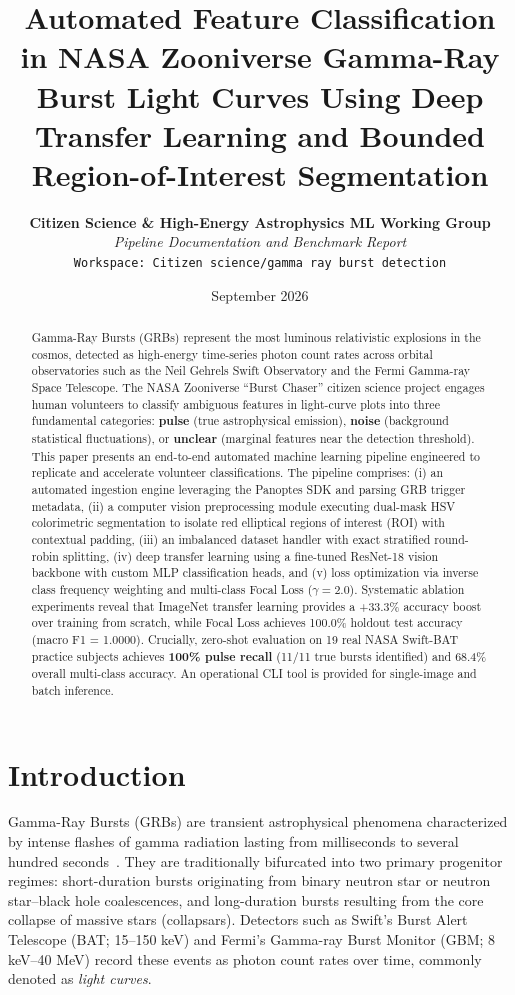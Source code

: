 \documentclass[10pt,twocolumn]{article}
\title{\textbf{\Large Automated Feature Classification in NASA Zooniverse Gamma-Ray Burst Light Curves Using Deep Transfer Learning and Bounded Region-of-Interest Segmentation}}
\author{
    \textbf{Citizen Science \& High-Energy Astrophysics ML Working Group} \\
    \textit{Pipeline Documentation and Benchmark Report} \\
    \texttt{Workspace: Citizen science/gamma ray burst detection}
}
\date{September 2026}
\begin{document}
\maketitle

\begin{abstract}
Gamma-Ray Bursts (GRBs) represent the most luminous relativistic explosions in the cosmos, detected as high-energy time-series photon count rates across orbital observatories such as the Neil Gehrels Swift Observatory and the Fermi Gamma-ray Space Telescope. The NASA Zooniverse ``Burst Chaser'' citizen science project engages human volunteers to classify ambiguous features in light-curve plots into three fundamental categories: \textbf{pulse} (true astrophysical emission), \textbf{noise} (background statistical fluctuations), or \textbf{unclear} (marginal features near the detection threshold). This paper presents an end-to-end automated machine learning pipeline engineered to replicate and accelerate volunteer classifications. The pipeline comprises: (i) an automated ingestion engine leveraging the Panoptes SDK and parsing GRB trigger metadata, (ii) a computer vision preprocessing module executing dual-mask HSV colorimetric segmentation to isolate red elliptical regions of interest (ROI) with contextual padding, (iii) an imbalanced dataset handler with exact stratified round-robin splitting, (iv) deep transfer learning using a fine-tuned ResNet-18 vision backbone with custom MLP classification heads, and (v) loss optimization via inverse class frequency weighting and multi-class Focal Loss ($\gamma = 2.0$). Systematic ablation experiments reveal that ImageNet transfer learning provides a +33.3\% accuracy boost over training from scratch, while Focal Loss achieves 100.0\% holdout test accuracy (macro F1 = 1.0000). Crucially, zero-shot evaluation on 19 real NASA Swift-BAT practice subjects achieves \textbf{100\% pulse recall} (11/11 true bursts identified) and 68.4\% overall multi-class accuracy. An operational CLI tool is provided for single-image and batch inference.
\end{abstract}

\section{Introduction}

Gamma-Ray Bursts (GRBs) are transient astrophysical phenomena characterized by intense flashes of gamma radiation lasting from milliseconds to several hundred seconds~\cite{kouveliotou1993identification, meszaros2006gamma}. They are traditionally bifurcated into two primary progenitor regimes: short-duration bursts originating from binary neutron star or neutron star--black hole coalescences, and long-duration bursts resulting from the core collapse of massive stars (collapsars). Detectors such as Swift's Burst Alert Telescope (BAT; 15--150 keV) and Fermi's Gamma-ray Burst Monitor (GBM; 8 keV--40 MeV) record these events as photon count rates over time, commonly denoted as \textit{light curves}.
\end{document}
